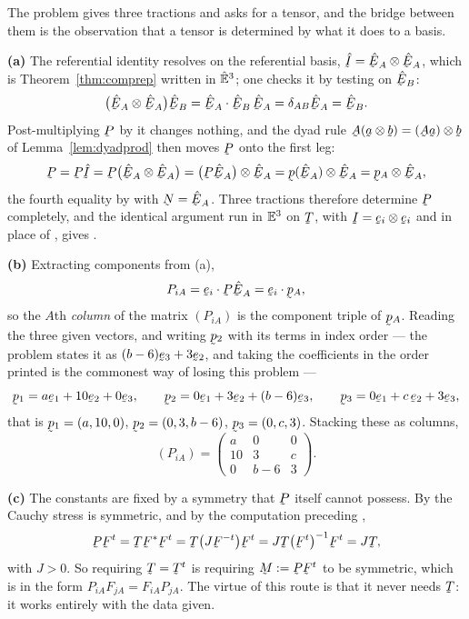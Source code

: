 \begin{solution}
The problem gives three tractions and asks for a tensor, and the bridge
between them is the observation that a tensor is determined by what it
does to a basis.

\medskip
\noindent\textbf{(a)}
The referential identity resolves on the referential basis,
$\hI=\hbE_{A}\otimes\hbE_{A}$, which is Theorem~\ref{thm:comprep}
written in $\hat{\mathbb{E}}^{3}$; one checks it by testing on $\hbE_{B}$:
\[
   \big(\hbE_{A}\otimes\hbE_{A}\big)\hbE_{B}
   =\ip{\hbE_{A}}{\hbE_{B}}\,\hbE_{A}
   =\dd_{AB}\hbE_{A}=\hbE_{B} .
\]
Post-multiplying $\bP$ by it changes nothing, and the dyad rule
$\bA(\ba\otimes\bb)=(\bA\ba)\otimes\bb$ of Lemma~\ref{lem:dyadprod}
then moves $\bP$ onto the first leg:
\[
   \bP=\bP\hI=\bP\big(\hbE_{A}\otimes\hbE_{A}\big)
   =\big(\bP\hbE_{A}\big)\otimes\hbE_{A}
   =\bp(\hbE_{A})\otimes\hbE_{A}=\bp_{A}\otimes\hbE_{A},
\]
the fourth equality by  with $\bN=\hbE_{A}$. Three tractions
therefore determine $\bP$ completely, and the identical argument run in
$\mathbb{E}^{3}$ on $\bT$, with $\I=\be_{i}\otimes\be_{i}$ and  in place
of , gives .


\medskip
\noindent\textbf{(b)}
Extracting components from (a),
\[
   P_{iA}=\ip{\be_{i}}{\bP\hbE_{A}}=\ip{\be_{i}}{\bp_{A}} ,
\]
so the $A$th \emph{column} of the matrix $(P_{iA})$ is the component
triple of $\bp_{A}$. Reading the three given vectors, and writing
$\bp_{2}$ with its terms in index order --- the problem states it as
$(b-6)\be_{3}+3\be_{2}$, and taking the coefficients in the order
printed is the commonest way of losing this problem ---
\[
   \bp_{1}=a\be_{1}+10\be_{2}+0\be_{3},
   \qquad
   \bp_{2}=0\be_{1}+3\be_{2}+(b-6)\be_{3},
   \qquad
   \bp_{3}=0\be_{1}+c\,\be_{2}+3\be_{3},
\]
that is $\bp_{1}=(a,10,0)$, $\bp_{2}=(0,3,b-6)$, $\bp_{3}=(0,c,3)$.
Stacking these as columns,
\[
   (P_{iA})=\begin{pmatrix}
     a & 0 & 0\\
     10 & 3 & c\\
     0 & b-6 & 3
   \end{pmatrix}.
\]

\medskip
\noindent\textbf{(c)}
The constants are fixed by a symmetry that $\bP$ itself cannot possess.
By  the Cauchy stress is symmetric, and by the computation
preceding ,
\[
   \bP\bF^{t}=\bT\bF^{*}\bF^{t}=\bT\big(J\bF^{-t}\big)\bF^{t}
   =J\bT\big(\bF^{t}\big)^{-1}\bF^{t}=J\bT ,
\]
with $J>0$. So requiring $\bT=\bT^{t}$ is requiring
$\bM:=\bP\bF^{t}$ to be symmetric, which is  in the form
$P_{iA}F_{jA}=F_{iA}P_{jA}$. The virtue of this route is that it never
needs $\bT$: it works entirely with the data given.


\end{solution}
